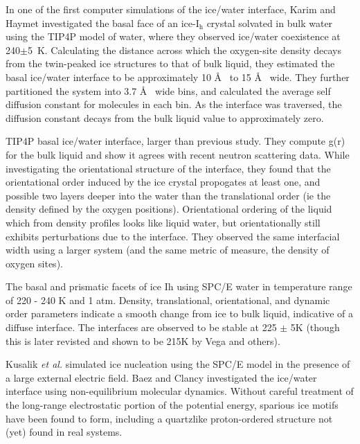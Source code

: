 In one of the first computer simulations of the ice/water interface,
Karim and Haymet investigated the basal face of an ice-I$_\mathrm{h}$
crystal solvated in bulk water using the TIP4P model of water, where
they observed ice/water coexistence at 240$\pm$5~K. Calculating the
distance across which the oxygen-site density decays from the
twin-peaked ice structures to that of bulk liquid, they estimated the
basal ice/water interface to be approximately 10 \AA~ to 15 \AA~
wide. They further partitioned the system into 3.7 \AA~ wide bins, and
calculated the average self diffusion constant for molecules in each
bin. As the interface was traversed, the diffusion constant decays
from the bulk liquid value to approximately zero.

TIP4P basal ice/water interface, larger than previous study. They
compute g(r) for the bulk liquid and show it agrees with recent
neutron scattering data.  While investigating the orientational
structure of the interface, they found that the orientational order
induced by the ice crystal propogates at least one, and possible two
layers deeper into the water than the translational order (ie the
density defined by the oxygen positions). Orientational ordering of
the liquid which from density profiles looks like liquid water, but
orientationally still exhibits perturbations due to the
interface. They observed the same interfacial width using a larger
system (and the same metric of measure, the density of oxygen sites).

The basal and prismatic facets of ice Ih using SPC/E water in
temperature range of 220 - 240 K and 1 atm. Density, translational,
orientational, and dynamic order parameters indicate a smooth change
from ice to bulk liquid, indicative of a diffuse interface. The
interfaces are observed to be stable at 225 $\pm$ 5K (though this is
later revisted and shown to be 215K by Vega and others). 

Kusalik \textit{et al.} simulated ice nucleation using the SPC/E model
in the presence of a large external electric field.\cite{14} Baez and
Clancy investigated the ice/water interface using non-equilibrium
molecular dynamics.\cite{15} Without careful treatment of the
long-range electrostatic portion of the potential energy, sparious ice
motifs have been found to form, including a quartzlike proton-ordered
structure not (yet) found in real systems.\cite{16} 

